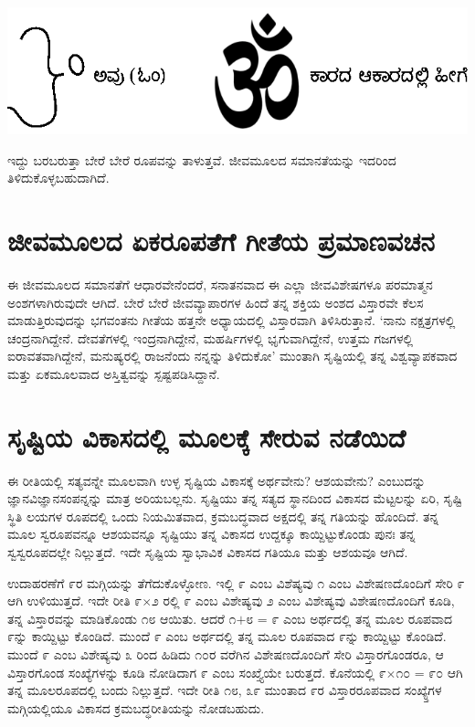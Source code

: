 \begin{center}
\includegraphics{chap5-fig2.eps}
\end{center}

ಇದ್ದು ಬರಬರುತ್ತಾ ಬೇರೆ ಬೇರೆ ರೂಪವನ್ನು ತಾಳುತ್ತವೆ. ಜೀವಮೂಲದ ಸಮಾನತೆಯನ್ನು ಇದರಿಂದ ತಿಳಿದುಕೊಳ್ಳಬಹುದಾಗಿದೆ.

\section*{ಜೀವಮೂಲದ ಏಕರೂಪತೆಗೆ ಗೀತೆಯ ಪ್ರಮಾಣವಚನ}

ಈ ಜೀವಮೂಲದ ಸಮಾನತೆಗೆ ಆಧಾರವೇನೆಂದರೆ, ಸನಾತನವಾದ ಈ ಎಲ್ಲಾ ಜೀವವಿಶೇಷಗಳೂ ಪರಮಾತ್ಮನ ಅಂಶಗಳಾಗಿರುವುದೇ ಆಗಿದೆ. ಬೇರೆ ಬೇರೆ ಜೀವವ್ಯಾಪಾರಗಳ ಹಿಂದೆ ತನ್ನ ಶಕ್ತಿಯ ಅಂಶದ ವಿಸ್ತಾರವೇ ಕೆಲಸ ಮಾಡುತ್ತಿರುವುದನ್ನು ಭಗವಂತನು ಗೀತೆಯ ಹತ್ತನೇ ಅಧ್ಯಾಯದಲ್ಲಿ ವಿಸ್ತಾರವಾಗಿ ತಿಳಿಸಿರುತ್ತಾನೆ. `ನಾನು ನಕ್ಷತ್ರಗಳಲ್ಲಿ ಚಂದ್ರನಾಗಿದ್ದೇನೆ. ದೇವತೆಗಳಲ್ಲಿ ಇಂದ್ರನಾಗಿದ್ದೇನೆ, ಮಹರ್ಷಿಗಳಲ್ಲಿ ಭೃಗುವಾಗಿದ್ದೇನೆ, ಉತ್ತಮ ಗಜಗಳಲ್ಲಿ ಐರಾವತವಾಗಿದ್ದೇನೆ, ಮನುಷ್ಯರಲ್ಲಿ ರಾಜನೆಂದು ನನ್ನನ್ನು ತಿಳಿದುಕೋ' ಮುಂತಾಗಿ ಸೃಷ್ಟಿಯಲ್ಲಿ ತನ್ನ ವಿಶ್ವವ್ಯಾಪಕವಾದ ಮತ್ತು ಏಕಮೂಲವಾದ ಅಸ್ತಿತ್ವವನ್ನು  ಸ್ಪಷ್ಟಪಡಿಸಿದ್ದಾನೆ.

\section*{ಸೃಷ್ಟಿಯ ವಿಕಾಸದಲ್ಲಿ ಮೂಲಕ್ಕೆ ಸೇರುವ ನಡೆಯಿದೆ}

ಈ ರೀತಿಯಲ್ಲಿ ಸತ್ಯವನ್ನೇ ಮೂಲವಾಗಿ ಉಳ್ಳ ಸೃಷ್ಟಿಯ ವಿಕಾಸಕ್ಕೆ ಅರ್ಥವೇನು? ಆಶಯವೇನು? ಎಂಬುದನ್ನು ಜ್ಞಾನವಿಜ್ಞಾನಸಂಪನ್ನನ್ನು ಮಾತ್ರ ಅರಿಯಬಲ್ಲನು. ಸೃಷ್ಟಿಯು ತನ್ನ ಸತ್ಯದ ಸ್ಥಾನದಿಂದ ವಿಕಾಸದ ಮೆಟ್ಟಲನ್ನು ಏರಿ, ಸೃಷ್ಟಿ ಸ್ಥಿತಿ ಲಯಗಳ ರೂಪದಲ್ಲಿ ಒಂದು ನಿಯಮಿತವಾದ, ಕ್ರಮಬದ್ಧವಾದ ಅಕ್ಷದಲ್ಲಿ ತನ್ನ ಗತಿಯನ್ನು ಹೊಂದಿದೆ. ತನ್ನ ಮೂಲ ಸ್ವರೂಪವನ್ನೂ ಆಶಯವನ್ನೂ ಸೃಷ್ಟಿಯು ತನ್ನ ವಿಕಾಸದ ಉದ್ದಕ್ಕೂ ಕಾಯ್ದಿಟ್ಟುಕೊಂಡು ಪುನಃ ತನ್ನ ಸ್ವಸ್ವರೂಪದಲ್ಲೇ ನಿಲ್ಲುತ್ತದೆ. ಇದೇ ಸೃಷ್ಟಿಯ ಸ್ವಾಭಾವಿಕ ವಿಕಾಸದ ಗತಿಯೂ ಮತ್ತು ಆಶಯವೂ ಆಗಿದೆ.

ಉದಾಹರಣೆಗೆ ೯ರ ಮಗ್ಗಿಯನ್ನು ತೆಗೆದುಕೊಳ್ಳೋಣ. ಇಲ್ಲಿ ೯ ಎಂಬ ವಿಶೆಷ್ಯವು ೧ ಎಂಬ ವಿಶೇಷಣದೊಂದಿಗೆ ಸೇರಿ ೯ ಆಗಿ ಉಳಿಯುತ್ತದೆ. ಇದೇ ರೀತಿ ೯$\times$೨ ರಲ್ಲಿ ೯ ಎಂಬ ವಿಶೇಷ್ಯವು ೨ ಎಂಬ ವಿಶೇಷ್ಯವು ವಿಶೇಷಣದೊಂದಿಗೆ ಕೂಡಿ, ತನ್ನ ವಿಸ್ತಾರವನ್ನು ಮಾಡಿಕೊಂಡು ೧೮ ಆಯಿತು. ಆದರೆ ೧$+$೮ = ೯ ಎಂಬ ಅರ್ಥದಲ್ಲಿ ತನ್ನ ಮೂಲ ರೂಪವಾದ ೯ನ್ನು ಕಾಯ್ದಿಟ್ಟು ಕೊಂಡಿದೆ. ಮುಂದೆ ೯ ಎಂಬ ಅರ್ಥದಲ್ಲಿ ತನ್ನ ಮೂಲ ರೂಪವಾದ ೯ನ್ನು ಕಾಯ್ದಿಟ್ಟು ಕೊಂಡಿದೆ. ಮುಂದೆ ೯ ಎಂಬ ವಿಶೇಷ್ಯವು ೩ ರಿಂದ ಹಿಡಿದು ೧೦ರ ವರೆಗಿನ ವಿಶೇಷಣದೊಂದಿಗೆ ಸೇರಿ ವಿಸ್ತಾರಗೊಂಡರೂ, ಆ ವಿಸ್ತಾರಗೊಂಡ ಸಂಖ್ಯೆಗಳನ್ನು ಕೂಡಿ ನೋಡಿದಾಗ ೯ ಎಂಬ ಸಂಖ್ತ್ಯೆಯೇ ಬರುತ್ತದೆ. ಕೊನೆಯಲ್ಲಿ ೯$\times$೧೦ = ೯೦ ಆಗಿ ತನ್ನ ಮೂಲರೂಪದಲ್ಲಿ ಬಂದು ನಿಲ್ಲುತ್ತದೆ. ಇದೇ ರೀತಿ ೧೮, ೩೯ ಮುಂತಾದ ೯ರ ವಿಸ್ತಾರರೂಪವಾದ ಸಂಖ್ಯ್ತೆಗಳ ಮಗ್ಗಿಯಲ್ಲಿಯೂ ವಿಕಾಸದ ಕ್ರಮಬದ್ಧರೀತಿಯನ್ನು ನೋಡಬಹುದು.

